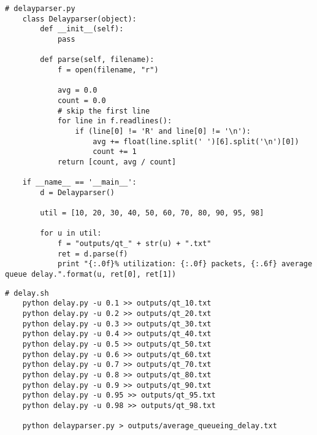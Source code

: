 \documentclass[11pt]{article}
\begin{document}
\vspace{5mm}

\begin{absolutelynopagebreak}
\begin{lstlisting}
# delayparser.py
    class Delayparser(object):
        def __init__(self):
            pass

        def parse(self, filename):
            f = open(filename, "r")

            avg = 0.0
            count = 0.0
            # skip the first line
            for line in f.readlines():
                if (line[0] != 'R' and line[0] != '\n'):
                    avg += float(line.split(' ')[6].split('\n')[0])
                    count += 1
            return [count, avg / count]

    if __name__ == '__main__':
        d = Delayparser()

        util = [10, 20, 30, 40, 50, 60, 70, 80, 90, 95, 98]

        for u in util:
            f = "outputs/qt_" + str(u) + ".txt"
            ret = d.parse(f)
            print "{:.0f}% utilization: {:.0f} packets, {:.6f} average queue delay.".format(u, ret[0], ret[1])
\end{lstlisting}
\end{absolutelynopagebreak}

\vspace{5mm}

\begin{absolutelynopagebreak}
\begin{lstlisting}
# delay.sh
    python delay.py -u 0.1 >> outputs/qt_10.txt
    python delay.py -u 0.2 >> outputs/qt_20.txt
    python delay.py -u 0.3 >> outputs/qt_30.txt
    python delay.py -u 0.4 >> outputs/qt_40.txt
    python delay.py -u 0.5 >> outputs/qt_50.txt
    python delay.py -u 0.6 >> outputs/qt_60.txt
    python delay.py -u 0.7 >> outputs/qt_70.txt
    python delay.py -u 0.8 >> outputs/qt_80.txt
    python delay.py -u 0.9 >> outputs/qt_90.txt
    python delay.py -u 0.95 >> outputs/qt_95.txt
    python delay.py -u 0.98 >> outputs/qt_98.txt

    python delayparser.py > outputs/average_queueing_delay.txt
\end{lstlisting}
\end{absolutelynopagebreak}

\vspace{5mm}
\end{document}
